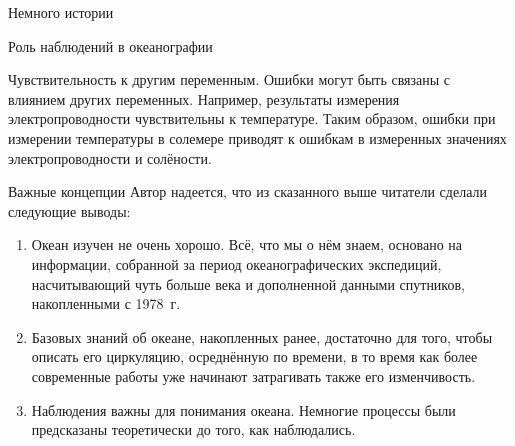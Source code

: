 \begin{chapter}{Немного истории}
\begin{section}{Роль наблюдений в океанографии}
\begin{paragraph}{Чувствительность к другим переменным.}
Ошибки могут быть связаны с влиянием других переменных. 
Например, результаты измерения электропроводности чувствительны к температуре. 
Таким образом, ошибки при измерении температуры в солемере приводят к 
ошибкам в измеренных значениях электропроводности и солёности.
%
\end{paragraph}
\end{section}

\begin{section}{Важные концепции}
Автор надеется, что из сказанного выше читатели сделали следующие выводы:
%
%
\begin{enumerate}
\item
Океан изучен не очень хорошо. Всё, что мы о нём знаем, основано на
информации, собранной за период океанографических экспедиций,
насчитывающий чуть больше века и дополненной данными
спутников, накопленными с 1978~г.
%

\item
Базовых знаний об океане, накопленных ранее, достаточно для того, чтобы
описать его циркуляцию, осреднённую по времени, в то время как более 
современные работы уже начинают затрагивать также его изменчивость.
%

\item
Наблюдения важны для понимания океана. Немногие процессы были
предсказаны теоретически до того, как наблюдались.
%


\end{enumerate}
\end{section}
\end{chapter}
